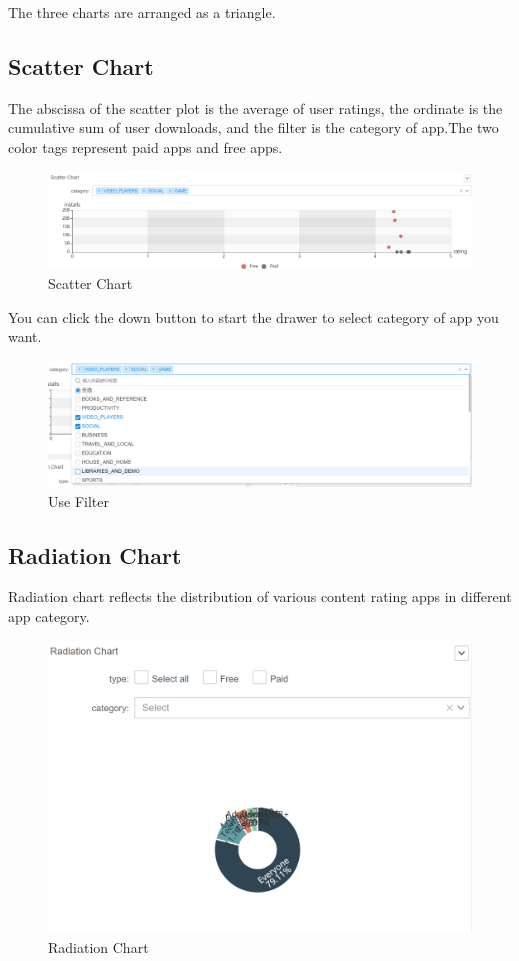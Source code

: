 \documentclass{hci}
\begin{document}
The three charts are arranged as a triangle.
\subsection{Scatter Chart}
The abscissa of the scatter plot is the average of user ratings, the ordinate is the cumulative sum of user downloads, and the filter is the category of app.The two color tags represent paid apps and free apps.
\begin{figure}[htbp]
	\centering
	\includegraphics[width=0.8\linewidth]{figures/scatter}
	\caption{Scatter Chart}
	\label{fig:Scatter Chart}
\end{figure}

You can click the down button to start the drawer to select category of app you want.
\begin{figure}[htbp]
	\centering
	\includegraphics[width=0.8\linewidth]{figures/filter}
	\caption{Use Filter}
	\label{fig:filter}
\end{figure}

\subsection{Radiation Chart}
Radiation chart reflects the distribution of various content rating apps in different app category.
\begin{figure}[htbp]
	\centering
	\includegraphics[width=0.7\linewidth]{figures/RadiationChart}
	\caption{Radiation Chart}
	\label{fig:RadiationChart}
\end{figure}
\end{document}
